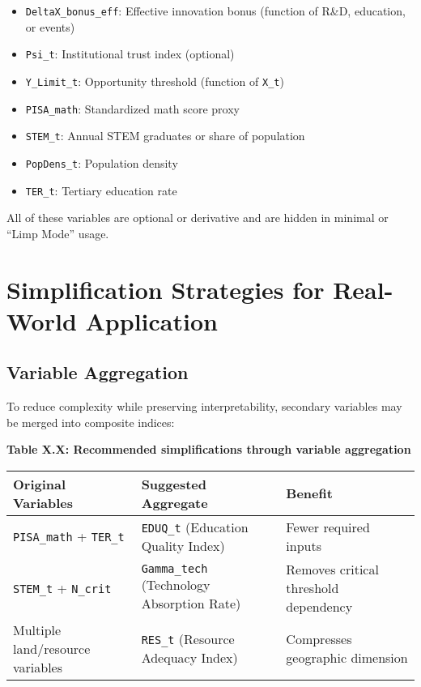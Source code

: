 \documentclass[12pt]{report}
\begin{document}
\begin{itemize}
  \item \texttt{DeltaX\_bonus\_eff}: Effective innovation bonus (function of R\&D, education, or events)
  \item \texttt{Psi\_t}: Institutional trust index (optional)
  \item \texttt{Y\_Limit\_t}: Opportunity threshold (function of \texttt{X\_t})
  \item \texttt{PISA\_math}: Standardized math score proxy
  \item \texttt{STEM\_t}: Annual STEM graduates or share of population
  \item \texttt{PopDens\_t}: Population density
  \item \texttt{TER\_t}: Tertiary education rate
\end{itemize}

\noindent All of these variables are optional or derivative and are hidden in minimal or ``Limp Mode'' usage.

\section{Simplification Strategies for Real-World Application}

\subsection{Variable Aggregation}

To reduce complexity while preserving interpretability, secondary variables may be merged into composite indices:

\vspace{0.5em}
\begin{center}
\textbf{Table X.X: Recommended simplifications through variable aggregation}
\vspace{0.5em}

\begin{tabular}{|p{5cm}|p{4.5cm}|p{4.5cm}|}
\hline
\textbf{Original Variables} & \textbf{Suggested Aggregate} & \textbf{Benefit} \\
\hline
\texttt{PISA\_math} + \texttt{TER\_t} & \texttt{EDUQ\_t} (Education Quality Index) & Fewer required inputs \\
\texttt{STEM\_t} + \texttt{N\_crit} & \texttt{Gamma\_tech} (Technology Absorption Rate) & Removes critical threshold dependency \\
Multiple land/resource variables & \texttt{RES\_t} (Resource Adequacy Index) & Compresses geographic dimension \\
\hline
\end{tabular}
\end{center}
\end{document}

